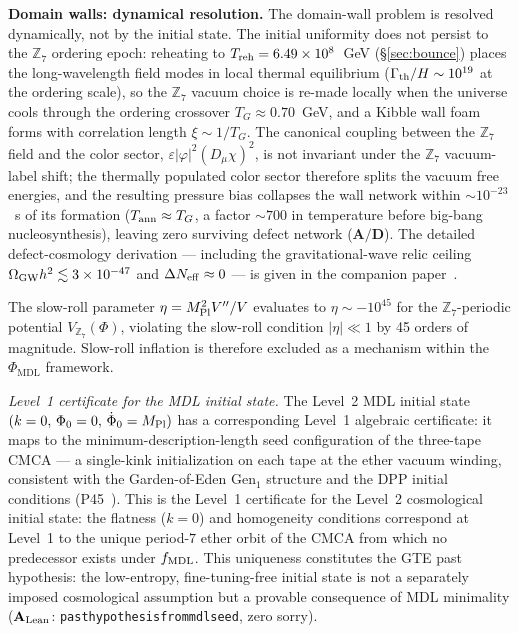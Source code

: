 \documentclass[11pt]{article}
\theoremstyle{remark}
\newcommand{\PHIMDL}{\Phi_{\mathrm{MDL}}}
\newcommand{\ZS}{\mathbb{Z}_7}
\newcommand{\lean}[1]{%
  \penalty-100
  \begingroup\def\_{\textunderscore\allowbreak}\texttt{#1}\endgroup}
\newcommand{\MPl}{M_{\rm Pl}}
\newcommand{\CatAL}{\ensuremath{\textbf{A}_{\rm Lean}}}
\newcommand{\CatAD}{\textbf{A/D}}
\begin{document}
\smallskip\noindent\textbf{Domain walls: dynamical resolution.}
The domain-wall problem is resolved dynamically, not by the initial state.  The
initial uniformity does not persist to the $\ZS$ ordering epoch: reheating to
$T_{\rm reh} = 6.49\times10^{8}$~GeV (\S\ref{sec:bounce}) places the long-wavelength
field modes in local thermal equilibrium ($\Gamma_{\rm th}/H \sim 10^{19}$ at the
ordering scale), so the $\ZS$ vacuum choice is re-made locally when the universe
cools through the ordering crossover $T_G \approx 0.70$~GeV, and a Kibble wall foam
forms with correlation length $\xi \sim 1/T_G$.  The canonical coupling between the
$\ZS$ field and the color sector, $\varepsilon|\varphi|^2(D_\mu\chi)^2$, is not
invariant under the $\ZS$ vacuum-label shift; the thermally populated color sector
therefore splits the vacuum free energies, and the resulting pressure bias collapses
the wall network within ${\sim}10^{-23}$~s of its formation
($T_{\rm ann}\approx T_G$, a factor ${\sim}700$ in temperature before big-bang
nucleosynthesis), leaving zero surviving defect network ($\CatAD$).  The detailed
defect-cosmology derivation --- including the gravitational-wave relic ceiling
$\Omega_{\rm GW}h^2 \lesssim 3\times10^{-47}$ and $\Delta N_{\rm eff}\approx 0$ ---
is given in the companion paper~\cite{SpivackGTECosmology}.

The slow-roll parameter $\eta = \MPl^2 V''/V$ evaluates to $\eta \sim -10^{45}$ for
the $\ZS$-periodic potential $V_{\ZS}(\Phi)$, violating the slow-roll condition
$|\eta|\ll 1$ by 45 orders of magnitude.  Slow-roll inflation is therefore excluded
as a mechanism within the $\PHIMDL$ framework.

\noindent\textit{Level~1 certificate for the MDL initial state.}\enspace
The Level~2 MDL initial state $(k=0,\,\Phi_0=0,\,\dot\Phi_0=M_{\rm Pl})$ has a
corresponding Level~1 algebraic certificate: it maps to the minimum-description-length
seed configuration of the three-tape CMCA --- a single-kink initialization on each tape
at the ether vacuum winding, consistent with the Garden-of-Eden Gen$_1$ structure and
the DPP initial conditions (P45~\cite{SpivackThreeTapeCMCA}).  This is the Level~1
certificate for the Level~2 cosmological initial state: the flatness ($k=0$) and
homogeneity conditions correspond at Level~1 to the unique period-$7$ ether orbit
of the CMCA from which no predecessor exists under $f_{\rm MDL}$.  This uniqueness
constitutes the GTE past hypothesis: the low-entropy, fine-tuning-free initial state
is not a separately imposed cosmological assumption but a provable consequence of MDL
minimality ($\CatAL$: \lean{past\_hypothesis\_from\_mdl\_seed}, zero sorry).
\end{document}

